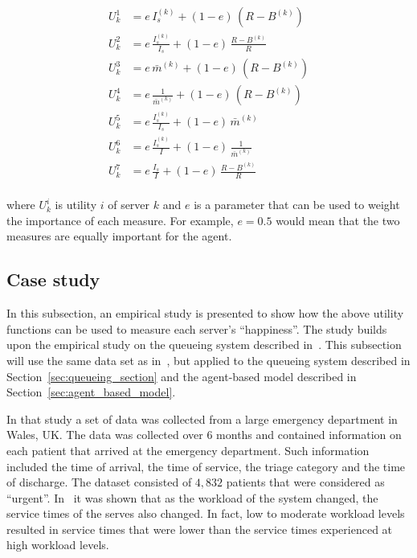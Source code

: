 \begin{align}
    U_k^1 &= e \, I_s^{(k)} + (1 - e) \, (R - B^{(k)})
    \label{eq:utility_1} \\
    U_k^2 &= e \, \frac{I_s^{(k)}}{I_s} + (1 - e) \, \frac{R - B^{(k)}}{R}
    \label{eq:utility_2} \\
    U_k^3 &= e \, \bar{m}^{(k)} + (1 - e) \, (R - B^{(k)})
    \label{eq:utility_3} \\
    U_k^4 &= e \, \frac{1}{\bar{m}^{(k)}} + (1 - e) \, (R - B^{(k)})
    \label{eq:utility_4} \\
    U_k^5 &= e \, \frac{I_s^{(k)}}{I_s} + (1 - e) \, \bar{m}^{(k)}
    \label{eq:utility_5} \\ 
    U_k^6 &= e \, \frac{I_s^{(k)}}{I} + (1 - e) \, \frac{1}{\bar{m}^{(k)}}
    \label{eq:utility_6} \\
    U_k^7 &= e \, \frac{I_s}{I} + (1 - e) \, \frac{R - B^{(k)}}{R}
    \label{eq:utility_7} \\
\end{align}

where \(U_k^i\) is utility \(i\) of server \(k\) and \(e\) is a parameter that
can be used to weight the importance of each measure.
For example, \(e = 0.5\) would mean that the two measures are equally important
for the agent.

\subsection{Case study}\label{sec:agent_based_case_study}

In this subsection, an empirical study is presented to show how the above
utility functions can be used to measure each server's ``happiness''.
The study builds upon the empirical study on the queueing system described
in~\cite{harper2020server}.
This subsection will use the same data set as in~\cite{harper2020server}, but
applied to the queueing system described in Section~\ref{sec:queueing_section}
and the agent-based model described in Section~\ref{sec:agent_based_model}.

In that study a set of data was collected from a large emergency department in
Wales, UK.
The data was collected over 6 months and contained information
on each patient that arrived at the emergency department.
Such information included the time of arrival, the time of service, the triage
category and the time of discharge.
The dataset consisted of \(4,832\) patients that were considered as ``urgent''.
In~\cite{harper2020server} it was shown that as the workload of the system
changed, the service times of the serves also changed.
In fact, low to moderate workload levels resulted in service times that were
lower than the service times experienced at high workload levels.

